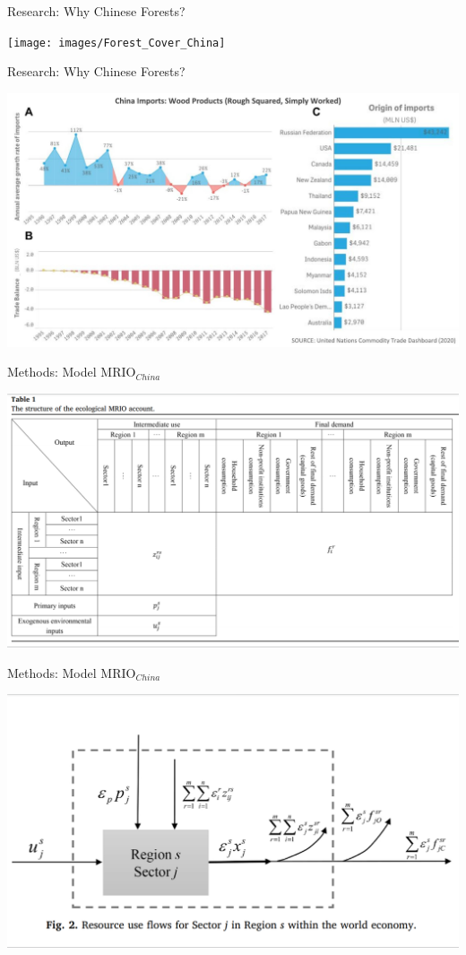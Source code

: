 \documentclass[ignorenonframetext,]{beamer}
\begin{document}
\begin{frame}{Research: Why Chinese Forests?}

\begin{center}\texttt{[image: images/Forest\_Cover\_China]} \end{center}

\end{frame}

\begin{frame}{Research: Why Chinese Forests?}

\begin{center}\includegraphics[width=0.5\linewidth]{images/comtrade_china_imports_wood} \end{center}

\end{frame}

\begin{frame}{Methods: Model MRIO\(_{China}\)}

\begin{center}\includegraphics[width=0.5\linewidth]{images/Wu_2018_Table1} \end{center}

\end{frame}

\begin{frame}{Methods: Model MRIO\(_{China}\)}

\begin{center}\includegraphics[width=0.5\linewidth]{images/Wu_2018_Fig2} \end{center}

\end{frame}
\end{document}

